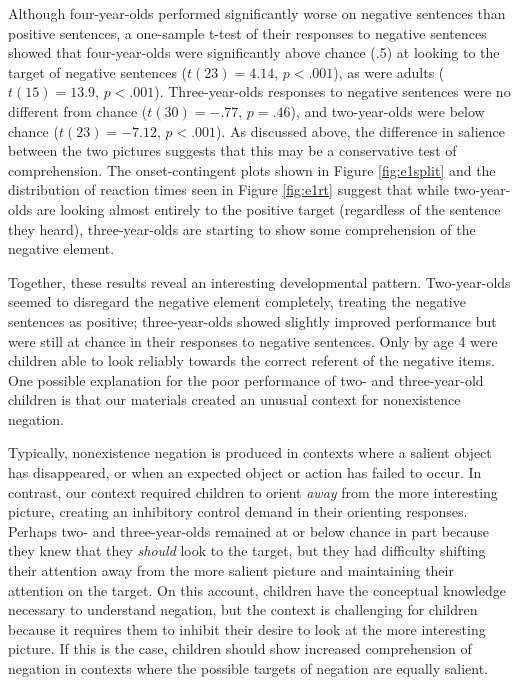 \documentclass[man]{apa2}
\begin{document}
Although four-year-olds performed significantly worse on negative sentences than positive sentences, a one-sample t-test of their responses to negative sentences showed that four-year-olds were significantly above chance (.5) at looking to the target of negative sentences ($t(23) = 4.14$, $p< .001$), as were adults ($t(15) = 13.9$, $p< .001$).  Three-year-olds responses to negative sentences were no different from chance ($t(30) = -.77$, $p=.46$), and two-year-olds were below chance ($t(23) = -7.12$, $p< .001$).  As discussed above, the difference in salience between the two pictures suggests that this may be a conservative test of comprehension.  The onset-contingent plots shown in Figure \ref{fig:e1split} and the distribution of reaction times seen in Figure \ref{fig:e1rt} suggest that while two-year-olds are looking almost entirely to the positive target (regardless of the sentence they heard), three-year-olds are starting to show some comprehension of the negative element.   

Together, these results reveal an interesting developmental pattern. Two-year-olds seemed to disregard the negative element completely, treating the negative sentences as positive; three-year-olds showed slightly improved performance but were still at chance in their responses to negative sentences.  Only by age 4 were children able to look reliably towards the correct referent of the negative items.  One possible explanation for the poor performance of two- and three-year-old children is that our materials created an unusual context for nonexistence negation.  

Typically, nonexistence negation is produced in contexts where a salient object has disappeared, or when an expected object or action has failed to occur.  In contrast, our context required children to orient \emph{away} from the more interesting picture, creating an inhibitory control demand in their orienting responses.  Perhaps two- and three-year-olds remained at or below chance in part because they knew that they \emph{should} look to the target, but they had difficulty shifting their attention away from the more salient picture and maintaining their attention on the target.  On this account, children have the conceptual knowledge necessary to understand negation, but the context is challenging for children because it requires them to inhibit their desire to look at the more interesting picture. If this is the case, children should show increased comprehension of negation in contexts where the possible targets of negation are equally salient.
\end{document}
